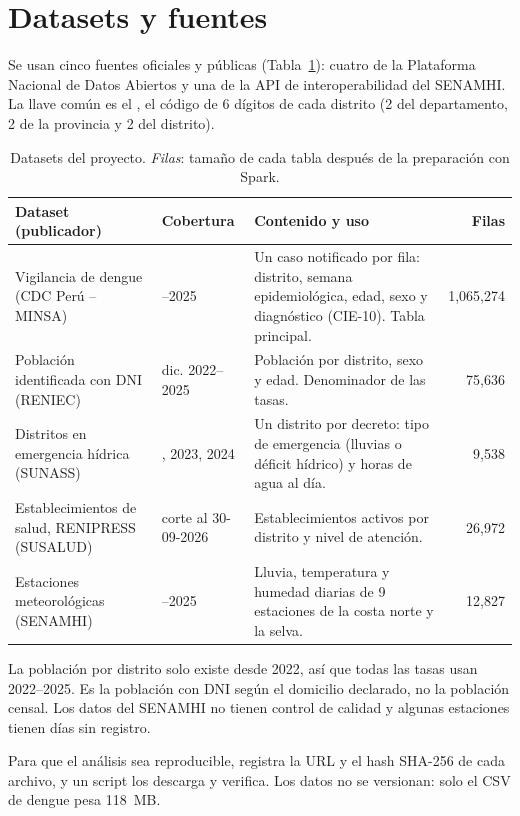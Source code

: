 \section{Datasets y fuentes}
\label{sec:datasets}

Se usan cinco fuentes oficiales y públicas (Tabla~\ref{tab:datasets}): cuatro de la Plataforma Nacional de
Datos Abiertos \cite{datosabiertos} y una de la API de interoperabilidad del SENAMHI. La llave común es el
, el código de 6 dígitos de cada distrito (2 del departamento, 2 de la provincia y 2 del distrito).

\begin{table}[htbp]
\centering
\caption{Datasets del proyecto. \emph{Filas}: tamaño de cada tabla después de la preparación con Spark.}
\label{tab:datasets}
\small
\begin{tabularx}{\textwidth}{@{}>{\raggedright\arraybackslash}p{4.1cm} >{\raggedright\arraybackslash}p{2.2cm} X r@{}}
\toprule
Dataset (publicador) & Cobertura & Contenido y uso & Filas \\
\midrule
Vigilancia de dengue (CDC Perú – MINSA) \cite{ds-dengue} & 2000–2025 &
  Un caso notificado por fila: distrito, semana epidemiológica, edad, sexo y diagnóstico (CIE-10).
  Tabla principal. & 1,065,274 \\
Población identificada con DNI (RENIEC) \cite{ds-reniec} & dic. 2022–2025 &
  Población por distrito, sexo y edad. Denominador de las tasas. & 75,636 \\
Distritos en emergencia hídrica (SUNASS) \cite{ds-sunass} & 2017, 2023, 2024 &
  Un distrito por decreto: tipo de emergencia (lluvias o déficit hídrico) y horas de agua al día. & 9,538 \\
Establecimientos de salud, RENIPRESS (SUSALUD) \cite{ds-renipress} & corte al 30-09-2026 &
  Establecimientos activos por distrito y nivel de atención. & 26,972 \\
Estaciones meteorológicas (SENAMHI) \cite{senamhi-api} & 2022–2025 &
  Lluvia, temperatura y humedad diarias de 9 estaciones de la costa norte y la selva. & 12,827 \\
\bottomrule
\end{tabularx}
\end{table}

La población por distrito solo existe desde 2022, así que todas las tasas usan 2022–2025. Es la población con
DNI según el domicilio declarado, no la población censal. Los datos del SENAMHI no tienen control de calidad y
algunas estaciones tienen días sin registro.

Para que el análisis sea reproducible,  registra la URL y el hash SHA-256 de cada
archivo, y un script los descarga y verifica. Los datos no se versionan: solo el CSV de dengue pesa 118~MB.
